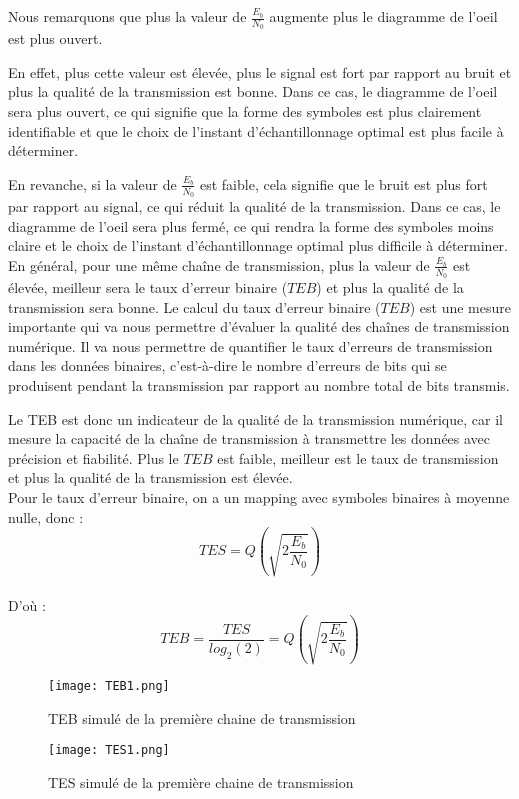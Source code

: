 \documentclass[11pt]{article}
\begin{document}
Nous remarquons que plus la valeur de $\frac{E_b}{N_0}$ augmente plus le diagramme de l'oeil est plus ouvert.

En effet, plus cette valeur est élevée, plus le signal est fort par rapport au bruit et plus la qualité de la transmission est bonne. Dans ce cas, le diagramme de l'oeil sera plus ouvert, ce qui signifie que la forme des symboles est plus clairement identifiable et que le choix de l'instant d'échantillonnage optimal est plus facile à déterminer.

En revanche, si la valeur de $\frac{E_b}{N_0}$ est faible, cela signifie que le bruit est plus fort par rapport au signal, ce qui réduit la qualité de la transmission. Dans ce cas, le diagramme de l'oeil sera plus fermé, ce qui rendra la forme des symboles moins claire et le choix de l'instant d'échantillonnage optimal plus difficile à déterminer. \\
En général, pour une même chaîne de transmission, plus la valeur de $\frac{E_b}{N_0}$ est élevée, meilleur sera le taux d'erreur binaire ($TEB$) et plus la qualité de la transmission sera bonne.
\newpage
Le calcul du taux d'erreur binaire ($TEB$) est une mesure importante qui va nous permettre d'évaluer la qualité des chaînes de transmission numérique. Il va nous permettre de quantifier le taux d'erreurs de transmission dans les données binaires, c'est-à-dire le nombre d'erreurs de bits qui se produisent pendant la transmission par rapport au nombre total de bits transmis.

Le TEB est donc un indicateur de la qualité de la transmission numérique, car il mesure la capacité de la chaîne de transmission à transmettre les données avec précision et fiabilité. Plus le $TEB$ est faible, meilleur est le taux de transmission et plus la qualité de la transmission est élevée. \\

Pour le taux d'erreur binaire, on a un mapping avec symboles binaires à moyenne nulle, donc :
$$ TES = Q( \sqrt{ 2 \frac{E_{b}}{N_{0}}}) $$ \\ 
D'où :
$$TEB = \frac{TES}{log_{2}(2)} = Q( \sqrt{ 2 \frac{E_{b}}{N_{0}}})$$

\begin{figure}[h]
  \centering
  \texttt{[image: TEB1.png]}
  \caption{TEB simulé de la première chaine de transmission}
  \label{fig:TEBCHAINE1}
  \vspace{0.2cm}
  \end{figure}

  \begin{figure}[h]
  \centering
  \texttt{[image: TES1.png]}
  \caption{TES simulé de la première chaine de transmission}
  \label{fig:TESCHAINE1}
  \vspace{0.2cm}
  \end{figure}
\end{document}
